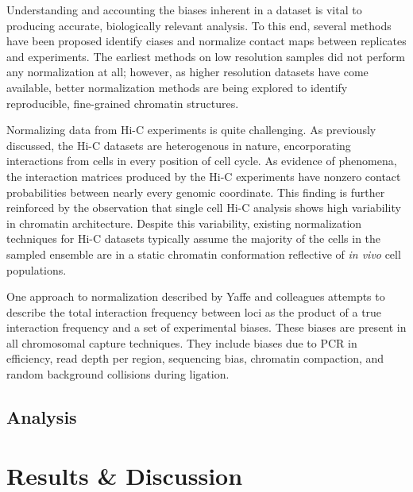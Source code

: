 \documentclass[phd,tocprelim]{cornell}
\begin{document}
Understanding and accounting the biases inherent in a dataset is vital to
producing accurate, biologically relevant analysis.  To this end, several methods
have been proposed identify ciases and normalize contact maps between replicates
and experiments\cite{yaffe2011}\cite{hu2012}\cite{yang2014}.  The earliest methods on low
resolution samples did not perform any normalization at all\cite{aiden2009};
however, as higher resolution datasets have come available, better
normalization methods are being explored to identify reproducible,
fine-grained chromatin structures.

Normalizing data from Hi-C experiments is quite challenging.  As previously
discussed, the Hi-C datasets are heterogenous in nature, encorporating
interactions from cells in every position of cell cycle.  As evidence of phenomena,
the interaction matrices produced by the Hi-C experiments have nonzero contact
probabilities between nearly every genomic coordinate\cite{dekker2013}.  This
finding is further reinforced by the observation that single cell Hi-C analysis
shows high variability in chromatin architecture\cite{nagano2013}.  Despite this
variability, existing normalization techniques for Hi-C datasets typically
assume the majority of the cells in the sampled ensemble are in a static
chromatin conformation reflective of \textit{in vivo} cell populations.

One approach to normalization described by Yaffe and colleagues\cite{yaffe2011}
attempts to describe the total interaction frequency between loci as the product
of a true interaction frequency and a set of experimental biases.  These biases
are present in all chromosomal capture techniques.  They include biases due to
PCR in efficiency, read depth per region, sequencing bias, chromatin compaction,
and random background collisions during ligation\cite{benner2014}\cite{dekker2006}.




\section{Analysis}



\chapter{Results \& Discussion}
\end{document}
